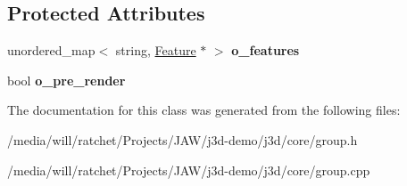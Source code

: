\subsection*{Protected Attributes}
\begin{DoxyCompactItemize}
\item 
\hypertarget{classj3d_1_1core_1_1Group_afb345d975b0a0e1c85f0b55bfe52bd70}{}unordered\+\_\+map$<$ string, \hyperlink{classj3d_1_1core_1_1Feature}{Feature} $\ast$ $>$ {\bfseries o\+\_\+features}\label{classj3d_1_1core_1_1Group_afb345d975b0a0e1c85f0b55bfe52bd70}

\item 
\hypertarget{classj3d_1_1core_1_1Group_acf9f16f1bf435fd55ef5e96e87598fc6}{}bool {\bfseries o\+\_\+pre\+\_\+render}\label{classj3d_1_1core_1_1Group_acf9f16f1bf435fd55ef5e96e87598fc6}

\end{DoxyCompactItemize}


The documentation for this class was generated from the following files\+:\begin{DoxyCompactItemize}
\item 
/media/will/ratchet/\+Projects/\+J\+A\+W/j3d-\/demo/j3d/core/group.\+h\item 
/media/will/ratchet/\+Projects/\+J\+A\+W/j3d-\/demo/j3d/core/group.\+cpp\end{DoxyCompactItemize}
